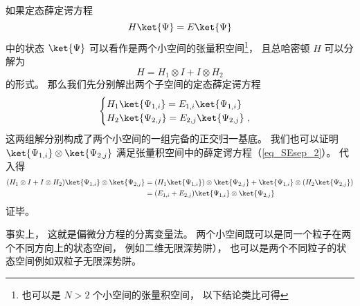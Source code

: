 
如果定态薛定谔方程
\begin{equation}\label{eq_SEsep_2}
H \ket{\Psi} = E \ket{\Psi}
\end{equation}
中的状态 $\ket{\Psi}$ 可以看作是两个小空间的张量积空间\footnote{也可以是 $N > 2$ 个小空间的张量积空间， 以下结论类比可得}， 且总哈密顿 $H$ 可以分解为
\begin{equation}\label{eq_SEsep_1}
H = H_1 \otimes I + I \otimes H_2
\end{equation}
的形式。 那么我们先分别解出两个子空间的定态薛定谔方程
\begin{equation}
\begin{cases}
H_1 \ket{\Psi_{1,i}} = E_{1,i} \ket{\Psi_{1,i}}\\
H_2 \ket{\Psi_{2,j}} = E_{2,j} \ket{\Psi_{2,j}}~,
\end{cases}
\end{equation}
这两组解分别构成了两个小空间的一组完备的正交归一基底。 我们也可以证明 $\ket{\Psi_{1,i}} \otimes \ket{\Psi_{2,j}}$ 满足张量积空间中的薛定谔方程（\autoref{eq_SEsep_2}）。 代入得
\begin{equation}
\begin{aligned}
(H_1 \otimes I + I \otimes H_2) \ket{\Psi_{1,i}} \otimes \ket{\Psi_{2,j}} &= (H_1 \ket{\Psi_{1,i}}) \otimes \ket{\Psi_{2,j}} +  \ket{\Psi_{1,i}} \otimes (H_2 \ket{\Psi_{2,j}})\\
&= (E_{1,i} + E_{2, j}) \ket{\Psi_{1,i}} \otimes \ket{\Psi_{2,j}}
\end{aligned}
\end{equation}
证毕。

事实上， 这就是偏微分方程的分离变量法。 两个小空间既可以是同一个粒子在两个不同方向上的状态空间， 例如二维无限深势阱）， 也可以是两个不同粒子的状态空间例如双粒子无限深势阱。%
